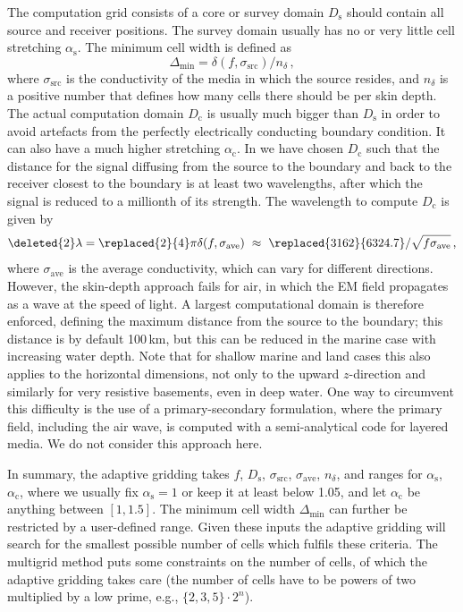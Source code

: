 \documentclass[extra, camera,%
    final,       %
]{gji}
\newcommand{\mr}[1]{\mathrm{#1}}
\newcommand{\emg}[2]{\texttt{emg#1#2}\xspace}
\begin{document}
The computation grid consists of a core or survey domain $D_\mr{s}$
 should contain all source and receiver positions. The
survey domain usually has no or very little cell stretching 
$\alpha_\mr{s}$. The minimum cell width is defined as
%
\begin{equation}
  \Delta_\mr{min}=\delta(f, \sigma_\mr{src})/n_\delta \, ,
  \label{eq:minwidth}
\end{equation}
%
where $\sigma_\mr{src}$ is the conductivity of the media in which the source
resides, and $n_\delta$ is a positive number that defines how many cells there
should be per skin depth. The actual computation domain $D_\mr{c}$ is
usually much bigger than $D_\mr{s}$ in order to avoid artefacts from the
perfectly electrically conducting boundary condition. It can also have a much
higher stretching  $\alpha_\mr{c}$. In  we have chosen $D_\mr{c}$ such that the distance for the
signal diffusing from the source to the boundary and back to the receiver
closest to the boundary is at least two wavelengths, after which the
 signal is reduced to a millionth of its
 strength. The wavelength \added{$\lambda$} to compute
$D_\mr{c}$ is given by
%
\begin{equation}
  \deleted{2}\lambda = \replaced{2}{4}\pi\delta(f, \sigma_\mr{ave})
  \ \approx \ \replaced{3162}{6324.7}/\sqrt{f\sigma_\mr{ave}}\, ,
 \label{eq:lambda}
\end{equation}
%
where $\sigma_\mr{ave}$ is the average conductivity, which can vary for
different directions. However, the skin-depth approach fails for air, in which
the EM field propagates as a wave at the speed of light. A largest
computational domain is therefore enforced, defining the maximum distance from
the source to the boundary; this distance is by default  100\,km,
but this can be reduced in the marine case with increasing water depth. Note
that for shallow marine and land cases this also applies to the horizontal
dimensions, not only to the upward $z$-direction and similarly for very
resistive basements, even in deep water. One way to circumvent this difficulty
is the use of a primary-secondary formulation, where the primary field,
including the air wave, is computed with a semi-analytical code for layered
media. We do not consider this approach here.

In summary, the adaptive gridding takes $f$, $D_\mr{s}$, $\sigma_\mr{src}$,
$\sigma_\mr{ave}$, $n_\delta$, and ranges for $\alpha_\mr{s}$, $\alpha_\mr{c}$,
where we usually fix $\alpha_\mr{s}=1$ or keep it at least below 1.05, and let
$\alpha_\mr{c}$ be anything between $[1, 1.5]$. The minimum cell width
$\Delta_\mr{min}$ can further be restricted by a user-defined range. Given
these inputs\added{,} the adaptive gridding will search for the smallest
possible number of cells which fulfils these criteria. The 
multigrid method \deleted{implemented in \emg3d} puts some constraints on the
number of cells, of which the adaptive gridding takes care (the number of cells
have to be powers of two multiplied by a low prime, e.g., $\{2,3,5\}\cdot2^n$).
\end{document}
